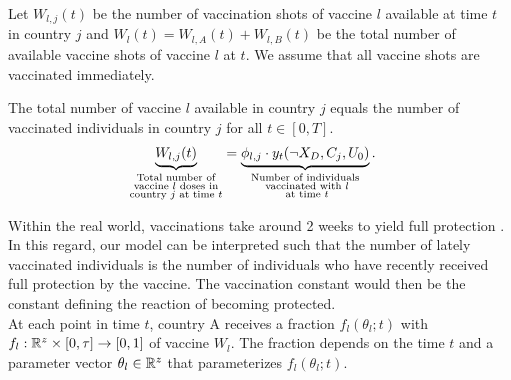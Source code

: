 Let $W_{l,j}(t)$ be the number of vaccination shots of vaccine $l$ available at time $t$ in country $j$ and $W_l(t) = W_{l,A}(t) + W_{l,B}(t)$ be the total number of available vaccine shots of vaccine $l$ at $t$. We assume that all vaccine shots are vaccinated immediately.
\begin{assumption}
\label{ass:vacc_immediately}
The total number of vaccine $l$ available in country $j$ equals the number of vaccinated individuals in country $j$ for all $t \in [0, T]$. 
\begin{align}
\label{eq:vaccine_country}
\underbrace{W_{l,j}(t)}_{\substack{\text{Total number of} \\ \text{vaccine } l \text{ doses in} \\ \text{country } j \text{ at time } t}} &= \underbrace{\phi_{l, j} \cdot y_t(\neg X_D, C_j, U_0)}_{\substack{\text{Number of individuals} \\ \text{ vaccinated with } l \\ \text{ at time } t}}  . 
\end{align}
\end{assumption}
\noindent Within the real world, vaccinations take around 2 weeks to yield full protection \citep{cdc.2021}. In this regard, our model can be interpreted such that the number of lately vaccinated individuals is the number of individuals who have recently received full protection by the vaccine. The vaccination constant would then be the constant defining the reaction of becoming protected. \\

At each point in time $t$, country A receives a fraction $f_{l}(\theta_l; t)$ with $f_{l}: \mathbb{R}^{z} \times [0, \tau] \to [0,1]$ of vaccine $W_l$. The fraction depends on the time $t$ and a parameter vector $\theta_l \in \mathbb{R}^{z}$ that parameterizes $f_{l}(\theta_l; t)$.\\


